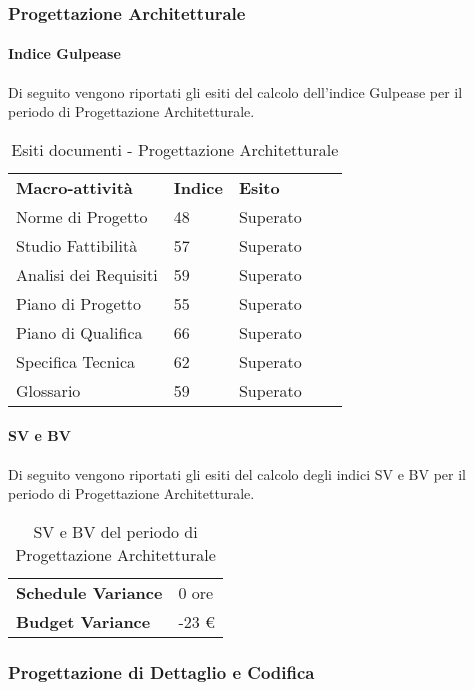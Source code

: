 \subsubsection{Progettazione Architetturale}
\paragraph*{Indice Gulpease}
Di seguito vengono riportati gli esiti del calcolo dell'indice Gulpease per il periodo di Progettazione Architetturale.
\begin{table}[H]
			\centering
				\begin{tabular}{|l|l|l|ll}
					\cline{1-3}
					 \textbf{Macro-attività}  & \textbf{Indice \glossaryItem{Gulpease}}  & \textbf{Esito}  &  \\ \cline{1-3}
					 Norme di Progetto & 48 & Superato &  \\ \cline{1-3}
					 Studio Fattibilità & 57 & Superato &  \\ \cline{1-3}
					 Analisi dei Requisiti & 59 & Superato &  \\ \cline{1-3}
					 Piano di Progetto & 55 & Superato &  \\ \cline{1-3}
					 Piano di Qualifica & 66 & Superato &  \\ \cline{1-3}
					 Specifica Tecnica & 62 & Superato & \\ \cline{1-3}
					 Glossario & 59 & Superato &  \\ \cline{1-3}
				\end{tabular}
				\caption{Esiti  documenti - Progettazione Architetturale}
		\end{table}
\paragraph*{SV e BV}
Di seguito vengono riportati gli esiti del calcolo degli indici SV e BV per il periodo di Progettazione Architetturale.
		\begin{table}[H]
		\centering
		\begin{tabular}{|l|l|}
		\cline{1-2}
		\textbf{Schedule Variance} & 0 ore \\ \cline{1-2}
		\textbf{Budget Variance} & -23 \euro{} \\ \cline{1-2}
		\end{tabular}
		\caption{SV e BV del periodo di Progettazione Architetturale}
		\end{table}

\subsubsection{Progettazione di Dettaglio e Codifica}
